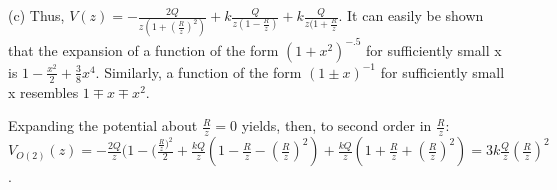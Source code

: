 \begin{homeworkProblem}
\begin{homeworkSection}{(c)}
Thus, $V(z) = -\frac{2Q}{z(1+(\frac{R}{z})^2)} + k \frac{Q}{z(1-\frac{R}{z})} + k\frac{Q}{z(1+\frac{R}{z}}$. It can easily be shown that the expansion of a function of the form $(1+x^2)^{-.5}$ for sufficiently small x is $1-\frac{x^2}{2}+\frac{3}{8}x^4$. Similarly, a function of the form $(1 \pm x)^{-1}$ for sufficiently small x resembles $1 \mp x \mp x^2$.

Expanding the potential about $\frac{R}{z} = 0$ yields, then, to second order in $\frac{R}{z}$: $V_{O(2)}(z) = -\frac{2Q}{z}(1-(\frac{\frac{R}{z})^2}{2}+\frac{kQ}{z}(1-\frac{R}{z}-(\frac{R}{z})^2)+\frac{kQ}{z}(1+\frac{R}{z}+(\frac{R}{z})^2)=3k\frac{Q}{z}(\frac{R}{z})^2$.

\end{homeworkSection}

\end{homeworkProblem}